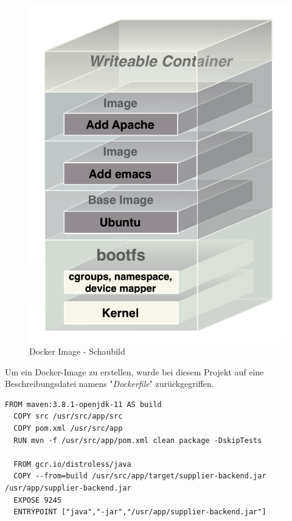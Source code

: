 \begin{figure}[ht!]
	\centering
	\includegraphics[width=.6\linewidth]{kapitel/problemloesung/implementierung/_img/docker-image-fig}
	\caption[Docker Image - Schaubild]{Docker Image - Schaubild \cite[Seite~72]{turnbulldocker}}
	\label{fig:dockerImage}
\end{figure}

Um ein Docker-Image zu erstellen, wurde bei diesem Projekt auf eine Beschreibungsdatei namens "\emph{Dockerfile}" zurückgegriffen.

\begin{minipage}{\linewidth}
\begin{lstlisting}[style=javaStyle,caption={Dockerfile - Supplier},label=lst:supplierDockerfile]
  FROM maven:3.8.1-openjdk-11 AS build
  COPY src /usr/src/app/src
  COPY pom.xml /usr/src/app
  RUN mvn -f /usr/src/app/pom.xml clean package -DskipTests

  FROM gcr.io/distroless/java
  COPY --from=build /usr/src/app/target/supplier-backend.jar /usr/app/supplier-backend.jar
  EXPOSE 9245
  ENTRYPOINT ["java","-jar","/usr/app/supplier-backend.jar"]
\end{lstlisting}
\end{minipage}

